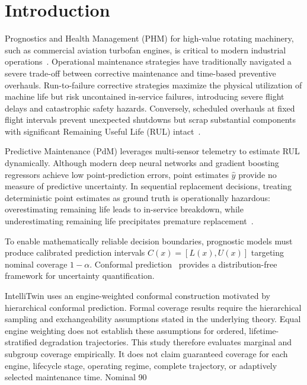 \section{Introduction}

Prognostics and Health Management (PHM) for high-value rotating machinery, such as commercial aviation turbofan engines, is critical to modern industrial operations~\cite{saxena2008damage,huang2021survey}. Operational maintenance strategies have traditionally navigated a severe trade-off between corrective maintenance and time-based preventive overhauls. Run-to-failure corrective strategies maximize the physical utilization of machine life but risk uncontained in-service failures, introducing severe flight delays and catastrophic safety hazards. Conversely, scheduled overhauls at fixed flight intervals prevent unexpected shutdowns but scrap substantial components with significant Remaining Useful Life (RUL) intact~\cite{shehadeh2024evaluating}.

Predictive Maintenance (PdM) leverages multi-sensor telemetry to estimate RUL dynamically. Although modern deep neural networks and gradient boosting regressors achieve low point-prediction errors, point estimates $\hat{y}$ provide no measure of predictive uncertainty. In sequential replacement decisions, treating deterministic point estimates as ground truth is operationally hazardous: overestimating remaining life leads to in-service breakdown, while underestimating remaining life precipitates premature replacement~\cite{chen2022data,diao2026turbofan}.

To enable mathematically reliable decision boundaries, prognostic models must produce calibrated prediction intervals $C(x) = [L(x), U(x)]$ targeting nominal coverage $1-\alpha$. Conformal prediction~\cite{javanmardi2023conformal} provides a distribution-free framework for uncertainty quantification.

IntelliTwin uses an engine-weighted conformal construction motivated by hierarchical conformal prediction. Formal coverage results require the hierarchical sampling and exchangeability assumptions stated in the underlying theory. Equal engine weighting does not establish these assumptions for ordered, lifetime-stratified degradation trajectories. This study therefore evaluates marginal and subgroup coverage empirically. It does not claim guaranteed coverage for each engine, lifecycle stage, operating regime, complete trajectory, or adaptively selected maintenance time. Nominal 90%


